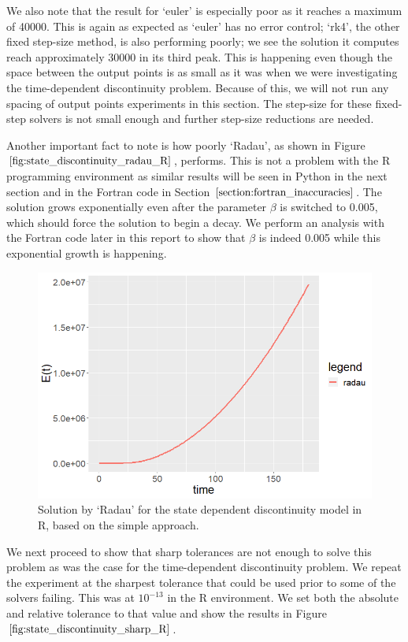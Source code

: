 We also note that the result for `euler' is especially poor as it reaches a maximum of 40000. This is again as expected as `euler' has no error control; `rk4', the other fixed step-size method, is also performing poorly; we see the solution it computes reach approximately 30000 in its third peak. This is happening even though the space between the output points is as small as it was when we were investigating the time-dependent discontinuity problem. Because of this, we will not run any spacing of output points experiments in this section. The step-size for these fixed-step solvers is not small enough and further step-size reductions are needed.

Another important fact to note is how poorly `Radau', as shown in Figure $\ref{fig:state_discontinuity_radau_R}$, performs. This is not a problem with the R programming environment as similar results will be seen in Python in the next section and in the Fortran code in Section $\ref{section:fortran_inaccuracies}$. The solution grows exponentially even after the parameter $\beta$ is switched to 0.005, which should force the solution to begin a decay. We perform an analysis with the Fortran code later in this report to show that $\beta$ is indeed 0.005 while this exponential growth is happening. 

\begin{figure}[h]
\centering
\includegraphics[width=0.7\linewidth]{./figures/state_discontinuity_radau_R}
\caption{Solution by `Radau' for the state dependent discontinuity model in R, based on the simple approach.}
\label{fig:state_discontinuity_radau_R}
\end{figure}

We next proceed to show that sharp tolerances are not enough to solve this problem as was the case for the time-dependent discontinuity problem. We repeat the experiment at the sharpest tolerance that could be used prior to some of the solvers failing. This was at $10^{-13}$ in the R environment. We set both the absolute and relative tolerance to that value and show the results in Figure $\ref{fig:state_discontinuity_sharp_R}$.

